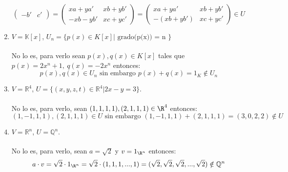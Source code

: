 \begin{ejercicio}
\begin{enumerate}
\begin{equation*}
\begin{pmatrix}
				      -b' & c'
			      \end{pmatrix} = \begin{pmatrix}
				      xa + ya'  & xb + yb' \\
				      -xb - yb' & xc + yc'
			      \end{pmatrix} =
			      \begin{pmatrix}
				      xa + ya'   & xb + yb' \\
				      -(xb +yb') & xc + yc'
			      \end{pmatrix}\in U
		      \end{equation*}
		\item $V = \mathbb{K} [x]$, $U_n = \{ p(x) \in K[x] | \text{ grado(p(x)) = n } \}$ \\  \\ No lo es, para verlo
		      sean $p(x),q(x) \in K[x]$ tales que $ p(x)= 2x^n +1, \ q(x)=-2x^n  $ entonces:
		      \begin{equation*}
			      p(x),q(x) \in U_n \text{ sin embargo } p(x)+q(x)=1_K \notin U_n
		      \end{equation*}
		\item $V = \mathbb{R}^4$, $U = \{(x,y,z,t) \in \mathbb{R}^4 | 2x - y = 3\}$.
		      \\ \\No lo es, para verlo, sean $(1,1,1,1), (2,1,1,1) \in \R^4$ entonces:
		      \begin{equation*}
			      (1,-1,1,1), (2,1,1,1) \in U \text{ sin embargo } (1,-1,1,1)+(2,1,1,1)=(3,0,2,2) \notin U
		      \end{equation*}
		\item $V = \mathbb{R}^n$, $U = \mathbb{Q}^n$.
		      \\ \\No lo es, para verlo, sean $a = \sqrt{2}$ y $v = 1_{\R^n}$ entonces:
		      \begin{equation*}
			      a \cdot v = \sqrt{2} \cdot 1_{\R^n} = \sqrt{2} \cdot (1,1,1,...,1) = (\sqrt{2},\sqrt{2},\sqrt{2},...,\sqrt{2}) \notin \mathbb{Q}^n
		      \end{equation*}


\end{enumerate}
\end{ejercicio}
